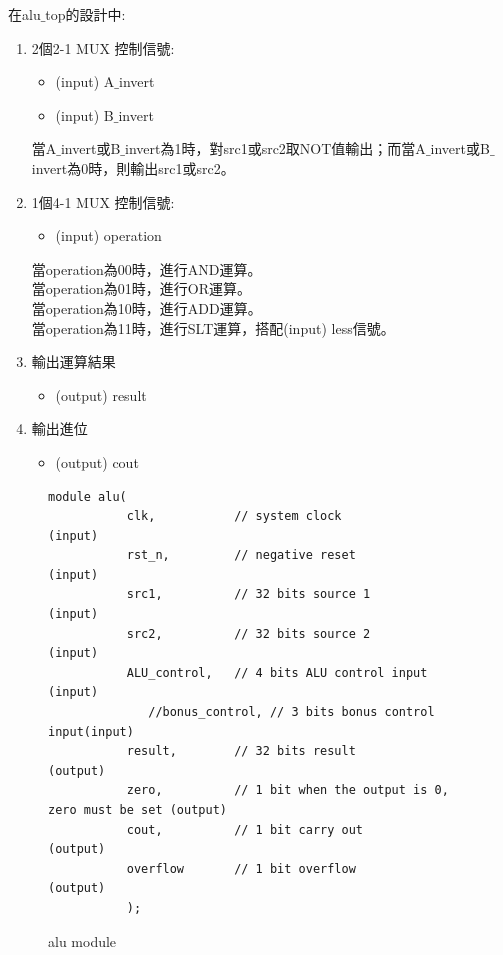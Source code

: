 \documentclass[12pt,a4paper]{article}
\theoremstyle{definition}
\begin{document}
在alu$\_$top的設計中:
\begin{enumerate}
\item 2個2-1 MUX 控制信號:
\begin{itemize}
\item (input) A$\_$invert
\item (input) B$\_$invert
\end{itemize}
當A$\_$invert或B$\_$invert為1時，對src1或src2取NOT值輸出；而當A$\_$invert或B$\_$invert為0時，則輸出src1或src2。

\item 1個4-1 MUX 控制信號:
\begin{itemize}
\item (input) operation
\end{itemize}
當operation為00時，進行AND運算。\\
當operation為01時，進行OR運算。\\
當operation為10時，進行ADD運算。\\
當operation為11時，進行SLT運算，搭配(input) less信號。

\item 輸出運算結果
\begin{itemize}
\item (output) result
\end{itemize}

\item 輸出進位
\begin{itemize}
\item (output) cout
\end{itemize}
\end{enumerate}

\begin{figure}[H]
\centering
\begin{lstlisting}[caption={}]
module alu(
           clk,           // system clock              (input)
           rst_n,         // negative reset            (input)
           src1,          // 32 bits source 1          (input)
           src2,          // 32 bits source 2          (input)
           ALU_control,   // 4 bits ALU control input  (input)
			  //bonus_control, // 3 bits bonus control input(input) 
           result,        // 32 bits result            (output)
           zero,          // 1 bit when the output is 0, zero must be set (output)
           cout,          // 1 bit carry out           (output)
           overflow       // 1 bit overflow            (output)
           );
\end{lstlisting}
\caption{alu module}
\label{fig:alu_}
\end{figure}
\end{document}
